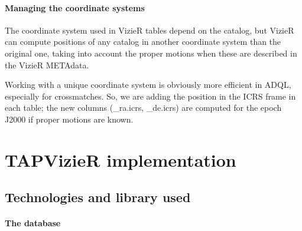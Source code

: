 \documentclass[11pt]{article}
\begin{document}
\paragraph{Managing the coordinate systems}

The coordinate system used in VizieR tables depend on the catalog, but VizieR 
can compute positions of any catalog in another coordinate system than the 
original one, taking into account the proper motions when these are 
described in the VizieR METAdata.

Working with a unique coordinate system is obviously more efficient
in ADQL, especially for crossmatches. So, we are adding the position in 
the ICRS frame in each table; 
the new columns (\_ra.icrs, \_de.icrs) are computed for the epoch J2000 
if proper motions are known.

%
%


\section{TAPVizieR implementation}

\subsection{Technologies and library used}
\paragraph{The database}
\end{document}

